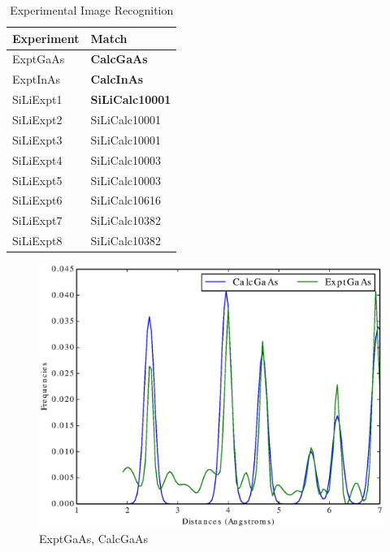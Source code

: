 \documentclass[12pt,letterpaper]{article}
\begin{document}
\begin{table}[h]
  \begin{center}
  \begin{tabular}{|l|l|}
    \hline
    \textbf{Experiment} & \textbf{Match} \\ \hline
    ExptGaAs            & \textbf{CalcGaAs}       \\ \hline
    ExptInAs            & \textbf{CalcInAs}       \\ \hline
    SiLiExpt1           & \textbf{SiLiCalc10001}  \\ \hline
    SiLiExpt2           & SiLiCalc10001  \\ \hline
    SiLiExpt3           & SiLiCalc10001  \\ \hline
    SiLiExpt4           & SiLiCalc10003  \\ \hline
    SiLiExpt5           & SiLiCalc10003  \\ \hline
    SiLiExpt6           & SiLiCalc10616  \\ \hline
    SiLiExpt7           & SiLiCalc10382  \\ \hline
    SiLiExpt8           & SiLiCalc10382  \\ \hline
  \end{tabular}
  \caption{Experimental Image Recognition}
  \end{center}
\end{table}

\begin{figure}[ht]
  \begin{center}
    \includegraphics[scale=0.8]{figs/SparseRepExptGaAs-CalcGaAs.eps}
    \caption{ExptGaAs, CalcGaAs}
  \end{center}
\end{figure}
\end{document}
